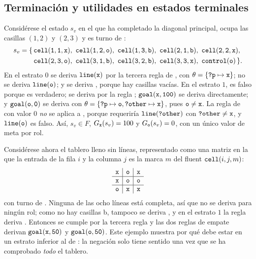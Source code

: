 \subsection{Terminación y utilidades en estados terminales}

Considérese el estado $s_v$ en el que  ha completado la diagonal principal,  ocupa las casillas $(1,2)$ y $(2,3)$ y es turno de :
\begin{align*}
    s_v = \{\, & \kw{cell}(\kw 1,\kw 1,\kw x),\ \kw{cell}(\kw 1,\kw 2,\kw o),\ \kw{cell}(\kw 1,\kw 3,\kw b),\ \kw{cell}(\kw 2,\kw 1,\kw b),\ \kw{cell}(\kw 2,\kw 2,\kw x),\\
    & \kw{cell}(\kw 2,\kw 3,\kw o),\ \kw{cell}(\kw 3,\kw 1,\kw b),\ \kw{cell}(\kw 3,\kw 2,\kw b),\ \kw{cell}(\kw 3,\kw 3,\kw x),\ \kw{control}(\kw o) \,\}.
\end{align*}
En el estrato $0$ se deriva $\texttt{line}(\texttt{x})$ por la tercera regla de , con $\theta = \{\texttt{?p} \mapsto \texttt{x}\}$; no se deriva $\texttt{line}(\texttt{o})$; y se deriva , porque hay casillas vacías. En el estrato $1$,  es falso porque  es verdadero;  se deriva por la regla ; $\texttt{goal}(\texttt{x}, \texttt{100})$ se deriva directamente; y $\texttt{goal}(\texttt{o}, \texttt{0})$ se deriva con $\theta = \{\texttt{?p} \mapsto \texttt{o}, \texttt{?other} \mapsto \texttt{x}\}$, pues $\texttt{o} \neq \texttt{x}$. La regla de  con valor $0$ \emph{no} se aplica a , porque requeriría $\texttt{line}(\texttt{?other})$ con $\texttt{?other} \neq \texttt{x}$, y $\texttt{line}(\texttt{o})$ es falso. Así, $s_v \in F$, $G_{\texttt{x}}(s_v) = 100$ y $G_{\texttt{o}}(s_v) = 0$, con un único valor de meta por rol.

Considérese ahora el tablero lleno sin líneas, representado como una matriz en la que la entrada de la fila $i$ y la columna $j$ es la marca $m$ del fluent $\texttt{cell}(i, j, m)$:
\begin{equation*}
    \begin{array}{c|c|c} \texttt{x} & \texttt{o} & \texttt{x} \\ \hline \texttt{x} & \texttt{o} & \texttt{o} \\ \hline \texttt{o} & \texttt{x} & \texttt{x} \end{array}
\end{equation*}
con turno de . Ninguna de las ocho líneas está completa, así que no se deriva  para ningún rol; como no hay casillas \kw b, tampoco se deriva , y en el estrato $1$ la regla  deriva . Entonces  se cumple por la tercera regla y las dos reglas de empate derivan $\texttt{goal}(\texttt{x}, \texttt{50})$ y $\texttt{goal}(\texttt{o}, \texttt{50})$. Este ejemplo muestra por qué  debe estar en un estrato inferior al de : la negación  solo tiene sentido una vez que se ha comprobado \emph{todo} el tablero.

